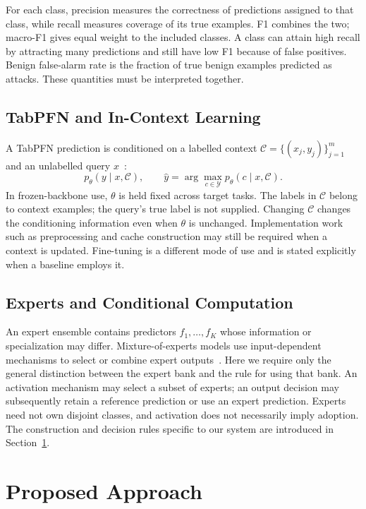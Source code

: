 \documentclass[sigconf,anonymous,pbalance]{acmart}
\newcommand{\ctx}{\mathcal{C}}
\begin{document}
For each class, precision measures the correctness of predictions assigned to that class, while recall measures coverage of its true examples. F1 combines the two; macro-F1 gives equal weight to the included classes. A class can attain high recall by attracting many predictions and still have low F1 because of false positives. Benign false-alarm rate is the fraction of true benign examples predicted as attacks. These quantities must be interpreted together.

\subsection{TabPFN and In-Context Learning}
\label{sec:tabpfn}
A TabPFN prediction is conditioned on a labelled context $\ctx=\{(x_j,y_j)\}_{j=1}^{m}$ and an unlabelled query $x$~\cite{hollmann2023tabpfn,hollmann2025tabpfn}:
\begin{equation}
 p_{\theta}(y\mid x,\ctx),\qquad
 \hat y=\arg\max_{c\in\mathcal{Y}}p_{\theta}(c\mid x,\ctx).
 \label{eq:icl}
\end{equation}
In frozen-backbone use, $\theta$ is held fixed across target tasks. The labels in $\ctx$ belong to context examples; the query's true label is not supplied. Changing $\ctx$ changes the conditioning information even when $\theta$ is unchanged. Implementation work such as preprocessing and cache construction may still be required when a context is updated. Fine-tuning is a different mode of use and is stated explicitly when a baseline employs it.

\subsection{Experts and Conditional Computation}
An expert ensemble contains predictors $f_1,\ldots,f_K$ whose information or specialization may differ. Mixture-of-experts models use input-dependent mechanisms to select or combine expert outputs~\cite{jacobs1991adaptive}. Here we require only the general distinction between the expert bank and the rule for using that bank. An activation mechanism may select a subset of experts; an output decision may subsequently retain a reference prediction or use an expert prediction. Experts need not own disjoint classes, and activation does not necessarily imply adoption. The construction and decision rules specific to our system are introduced in Section~\ref{sec:approach}.

\section{Proposed Approach}
\label{sec:approach}
\end{document}
